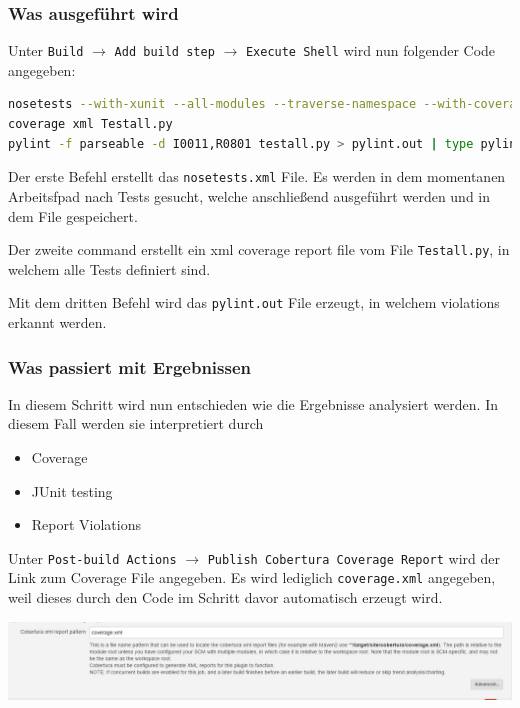 \subsubsection{Was ausgeführt wird}
Unter \verb|Build| $\rightarrow$ \verb|Add build step| $\rightarrow$ \verb|Execute Shell| wird nun folgender Code angegeben:

\begin{lstlisting}[language=bash]
nosetests --with-xunit --all-modules --traverse-namespace --with-coverage --cover-inclusive
coverage xml Testall.py 
pylint -f parseable -d I0011,R0801 testall.py > pylint.out | type pylint.out
\end{lstlisting}

Der erste Befehl erstellt das \verb|nosetests.xml| File. Es werden in dem momentanen Arbeitsfpad nach Tests gesucht, welche anschließend ausgeführt werden und in dem File gespeichert.

Der zweite command erstellt ein xml coverage report file vom File \verb|Testall.py|, in welchem alle Tests definiert sind.

Mit dem dritten Befehl wird das \verb|pylint.out| File erzeugt, in welchem violations erkannt werden. 

\subsubsection{Was passiert mit Ergebnissen}
In diesem Schritt wird nun entschieden wie die Ergebnisse analysiert werden. In diesem Fall werden sie interpretiert durch
\begin{itemize}
	\item Coverage
	\item JUnit testing
	\item Report Violations
\end{itemize}

Unter \verb|Post-build Actions| $\rightarrow$ \verb|Publish Cobertura Coverage Report| wird der Link zum Coverage File angegeben. Es wird lediglich \verb|coverage.xml| angegeben, weil dieses durch den Code im Schritt davor automatisch erzeugt wird.

\begin{minipage}{\linewidth}
	\centering
	\includegraphics[width=0.8\linewidth]{images/coverage_report}
\end{minipage}

